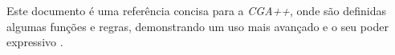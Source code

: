 \label{an:material_cga++}

Este documento é uma referência concisa para a \textit{CGA++}, onde são definidas algumas funções e regras, demonstrando um uso mais avançado e o seu poder expressivo \cite{schwarz2015}.


